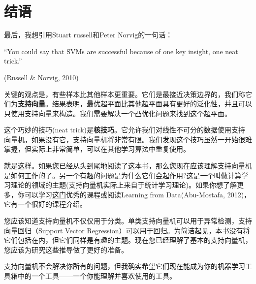 \chapter{结语}

最后，我想引用Stuart russell和Peter Norvig的一句话：

“You could say that SVMs are successful because of one key insight, one neat trick.”

(Russell \& Norvig, 2010)

关键的观点是，有些样本比其他样本更重要。它们是最接近决策边界的，我们称它们为\textbf{支持向量}。结果表明，最优超平面比其他超平面具有更好的泛化性，并且可以只使用支持向量来构造。我们需要解决一个凸优化问题来找到这个超平面。

这个巧妙的技巧(neat trick)是\textbf{核技巧}。它允许我们对线性不可分的数据使用支持向量机，如果没有它，支持向量机将非常有限。我们发现这个技巧虽然一开始很难掌握，但实际上非常简单，可以在其他学习算法中重复使用。

就是这样。如果您已经从头到尾地阅读了这本书，那么您现在应该理解支持向量机是如何工作的了。另一个有趣的问题是为什么它们会起作用?这是一个叫做计算学习理论的领域的主题(支持向量机实际上来自于统计学习理论)。如果你想了解更多，你可以学习\href{http://work.caltech.edu/telecourse.html}{这门}优秀的课程或阅读Learning from Data(Abu-Mostafa, 2012)，它有一个很好的课程介绍。

您应该知道支持向量机不仅仅用于分类。单类支持向量机可以用于异常检测，支持向量回归（Support Vector Regression）可以用于回归。为简洁起见，本书没有将它们包括在内，但它们同样是有趣的主题。现在您已经理解了基本的支持向量机，您应该为研究这些推导做了更好的准备。

支持向量机不会解决你所有的问题，但我确实希望它们现在能成为你的机器学习工具箱中的一个工具——一个你能理解并喜欢使用的工具。